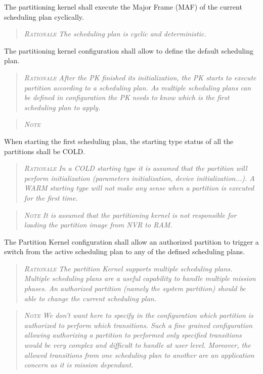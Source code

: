 The partitioning kernel shall execute the Major Frame (MAF) of the current scheduling plan cyclically.
\begin{quote}\it
\textsc{Rationale}
The scheduling plan is cyclic and deterministic.
\end{quote}

The partitioning kernel configuration shall allow to define the default scheduling plan.
\begin{quote}\it
\textsc{Rationale}
After the PK finished its initialization, the PK starts to execute partition according to a scheduling plan. As multiple scheduling plans can be defined in configuration the PK needs to know which is the first scheduling plan to apply.
\end{quote}
\begin{quote}\it
\textsc{Note}

\end{quote}

When starting the first scheduling plan, the starting type status of all the partitions shall be COLD.
\begin{quote}\it
\textsc{Rationale}
In a COLD starting type it is assumed that the partition will perform initialization (parameters initialization, device initialization...). A WARM starting type will not make any sense when a partition is executed for the first time.
\end{quote}
\begin{quote}\it
\textsc{Note}
It is assumed that the partitioning kernel is not responsible for loading the partition image from NVR to RAM.
\end{quote}

The Partition Kernel configuration shall allow an authorized partition to trigger a switch from the active scheduling plan to any of the defined scheduling plans.
\begin{quote}\it
\textsc{Rationale}
The partition Kernel supports multiple scheduling plans. Multiple scheduling plans are a useful capability to handle multiple mission phases. An authorized partition (namely the system partition) should be able to change the current scheduling plan.
\end{quote}
\begin{quote}\it
\textsc{Note}
We don't want here to specify in the configuration which partition is authorized to perform which transitions. Such a fine grained configuration allowing authorizing a partition to performed only specified transitions would be very complex and difficult to handle at user level. Moreover, the allowed transitions from one scheduling plan to another are an application concern as it is mission dependant.
\end{quote}

